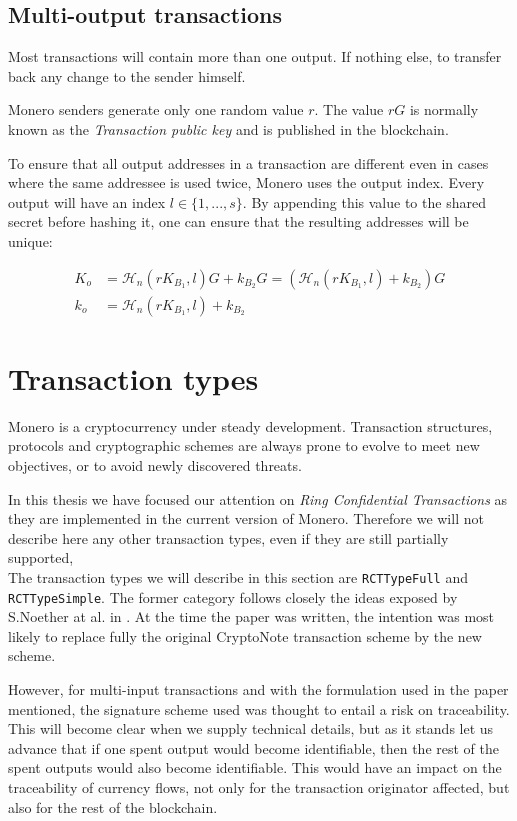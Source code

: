 \subsection{Multi-output transactions}

Most transactions will contain more than one output. 
If nothing else, to transfer back any change to the sender himself.

Monero senders generate only one random value \(r\). The value \(r G\) is normally known as the 
{\em Transaction public key} and is published in the blockchain.

To ensure that all output addresses in a transaction are different even in cases where the same addressee is
used twice, Monero uses the output index.
Every output will have an index \(l \in \{1, ..., s\}\). 
By appending this value to the shared secret before hashing it, one can ensure that the resulting
addresses will be unique:

\begin{align*}
  K_o &= \mathcal{H}_n (r K_{B_1}, l) G + k_{B_2} G = (\mathcal{H}_n (r K_{B_1}, l) + k_{B_2} ) G \\ 
  k_o &= \mathcal{H}_n (r K_{B_1}, l) + k_{B_2}
\end{align*} 

 



\section{Transaction types}

Monero is a cryptocurrency under steady development.
Transaction structures, protocols and cryptographic schemes are always prone to evolve
to meet new objectives, or to avoid newly discovered threats.

In this thesis we have focused our attention on {\em Ring Confidential Transactions} as they are implemented
in the current version of Monero. Therefore we will not describe here any other transaction types, even if
they are still partially supported,
\\

The transaction types we will describe in this section are {\tt RCTTypeFull} and {\tt RCTTypeSimple}.
The former category follows closely the ideas exposed by S.Noether at al. in \cite{ledger34}.
At the time the paper was written, the intention was most likely to replace fully the original CryptoNote
transaction scheme by the new scheme.

However, for multi-input transactions and with the formulation used in the paper mentioned,
the signature scheme used was thought to entail a risk on traceability. 
This will become clear when
we supply technical details, but as it stands let us advance that if one spent output would become
identifiable, then the rest of the spent outputs would also become identifiable.
This would have an impact on the traceability of currency flows, not only for the transaction originator
affected, but also for the rest of the blockchain.
\\

